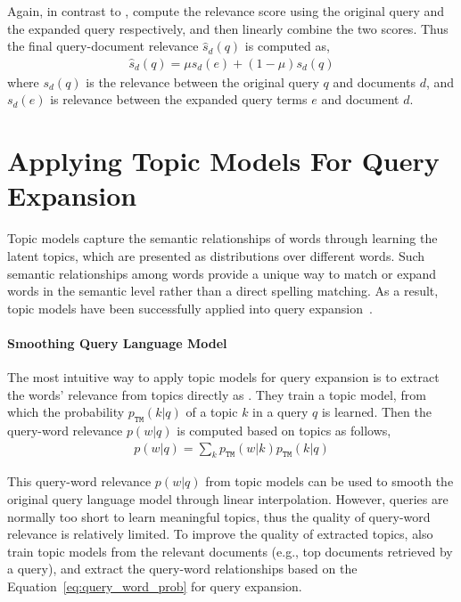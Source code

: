 Again, in contrast to \cite{zhai-01b}, \cite{Lavrenko-2001} compute
the relevance score using the original query and the expanded query
respectively, and then linearly combine the two scores. Thus the final
query-document relevance $\hat{s}_d(q)$ is computed as,
\begin{align}
\label{eq:rm_qe_comb}
\hat{s}_d(q) = \mu s_d(e) + (1-\mu)s_d(q)
\end{align}
where $s_d(q)$ is the relevance between the original query $q$ and
documents $d$, and $s_d(e)$ is relevance between the expanded query
terms $e$ and document $d$.

\section{Applying Topic Models For Query Expansion}

Topic models capture the semantic relationships of words through
learning the latent topics, which are presented as distributions over
different words. Such semantic relationships among words provide a
unique way to match or expand words in the semantic level rather than
a direct spelling matching. As a result, topic models have been
successfully applied into query expansion~\citep{Yi-2009,Park-2009}.

\paragraph{Smoothing Query Language Model}

The most intuitive way to apply topic models for query expansion is to
extract the words' relevance from topics directly as
\cite{Yi-2009}. They train a topic model, from which the probability
$p_{\texttt{TM}}(k|q)$ of a topic $k$ in a query $q$ is learned. Then
the query-word relevance $p(w|q)$ is computed based on topics as
follows,
\begin{align}
\label{eq:query_word_prob}
p(w|q) = \sum_k p_{\texttt{TM}}(w|k) p_{\texttt{TM}}(k|q)
\end{align}

This query-word relevance $p(w|q)$ from topic models can be used to
smooth the original query language model through linear
interpolation. However, queries are normally too short to learn
meaningful topics, thus the quality of query-word relevance is
relatively limited. To improve the quality of extracted topics,
\cite{Yi-2009} also train topic models from the relevant documents
(e.g., top documents retrieved by a query), and extract the query-word
relationships based on the Equation~\ref{eq:query_word_prob} for query
expansion.

